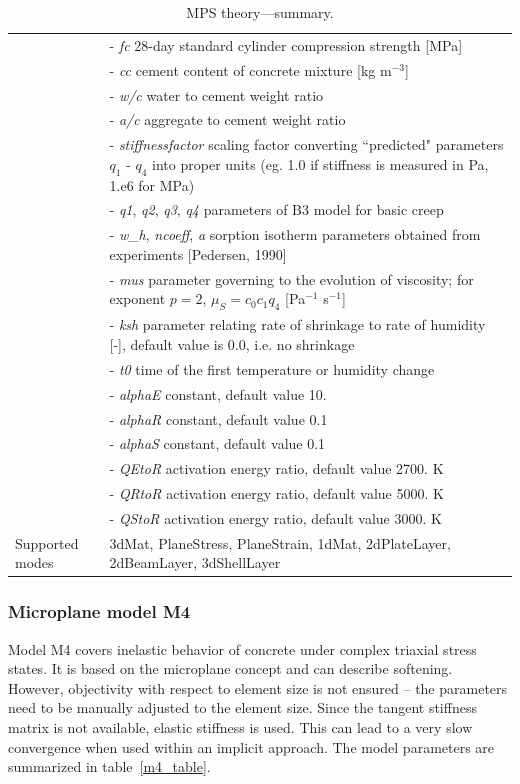 \documentclass[a4paper]{article}
\newcommand{\param}[1]{{\it #1}}
\begin{document}
\begin{table}[!htb]
\begin{tabular}{|l|p{9cm}|}
\hline
%
&- \param{fc} 28-day standard cylinder compression strength [MPa]\\
&- \param{cc} cement content of concrete mixture  [kg m$^{-3}$] \\
&- \param{w/c} water to cement weight ratio\\
&- \param{a/c} aggregate to cement weight ratio\\
&- \param{stiffnessfactor} scaling factor converting ``predicted" parameters $q_1$ - $q_4$ into proper units (eg. 1.0 if stiffness is measured in Pa, 1.e6 for MPa)\\
&- \param{q1}, \param{q2}, \param{q3}, \param{q4} parameters of B3 model for basic creep\\
&- \param{w\_h}, \param{ncoeff}, \param{a} sorption isotherm parameters obtained from experiments [Pedersen, 1990] \\
%
&- \param{mus} parameter governing to the evolution of viscosity; for exponent $p=2$, $\mu_S = c_0 c_1 q_4$ [Pa$^{-1}$ s$^{-1}$] \\
&- \param{ksh} parameter relating rate of shrinkage to rate of humidity [-], default value is 0.0, i.e. no shrinkage\\
&- \param{t0} time of the first temperature or humidity change\\
&- \param{alphaE} constant, default value 10.\\
&- \param{alphaR} constant, default value 0.1\\
&- \param{alphaS} constant, default value 0.1\\
&- \param{QEtoR} activation energy ratio, default value 2700. K\\
&- \param{QRtoR} activation energy ratio, default value 5000. K\\
&- \param{QStoR} activation energy ratio, default value 3000. K\\
%
Supported modes& 3dMat, PlaneStress, PlaneStrain, 1dMat,
2dPlateLayer, 2dBeamLayer, 3dShellLayer\\
\hline
\end{tabular}

\caption{MPS theory---summary.}
\label{mps_table}

\end{table}



\clearpage


\subsubsection{Microplane model M4}
Model M4 covers inelastic behavior of concrete under complex
triaxial stress states. It is based on the microplane concept and
can describe softening. However, 
objectivity with respect
to element size is not ensured -- the parameters need to be manually adjusted
to the element size. Since the tangent stiffness matrix is not available, 
elastic stiffness is used. This can lead to a very slow convergence 
when used within an implicit approach.
The model parameters are summarized
in table~\ref{m4_table}.
\end{document}
